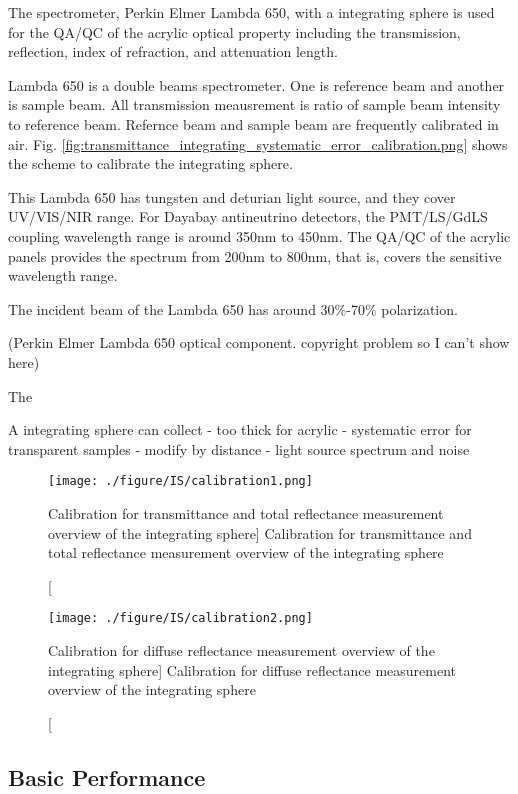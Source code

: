 The spectrometer, Perkin Elmer Lambda 650, with a integrating sphere is used for the QA/QC
of the acrylic optical property including
the transmission, reflection, index of refraction, and attenuation length.

Lambda 650 is a double beams spectrometer. One is reference beam and another is
sample beam. All transmission meausrement is ratio of sample beam intensity to
reference beam. Refernce beam and sample beam are frequently calibrated in air.
Fig. \ref{fig:transmittance_integrating_systematic_error_calibration.png} shows the scheme
to calibrate the integrating sphere.

This Lambda 650 has tungsten and deturian light source, and they cover UV/VIS/NIR
range. For Dayabay antineutrino detectors, the PMT/LS/GdLS coupling wavelength range
is around 350nm to 450nm. The QA/QC of the acrylic panels provides the spectrum
from 200nm to 800nm, that is, covers the sensitive wavelength range.

The incident beam of the Lambda 650 has around 30\%-70\% polarization.


(Perkin Elmer Lambda 650 optical component. copyright problem so I can't show here)


The


A integrating sphere can collect
    - too thick for acrylic
    - systematic error for transparent samples
        - modify by distance
    - light source spectrum and noise


\begin{figure}
    \centering
    \texttt{[image: ./figure/IS/calibration1.png]}
    \caption
    [Calibration for transmittance and total reflectance measurement overview of the integrating sphere]
    {Calibration for transmittance and total reflectance measurement overview of the integrating sphere}
    \label{fig:calibration1.png}
    \end{figure}

\begin{figure}
    \centering
    \texttt{[image: ./figure/IS/calibration2.png]}
    \caption
    [Calibration for diffuse reflectance measurement overview of the integrating sphere]
    {Calibration for diffuse reflectance measurement overview of the integrating sphere}
    \label{fig:calibration2.png}
    \end{figure}



\subsection{Basic Performance}

